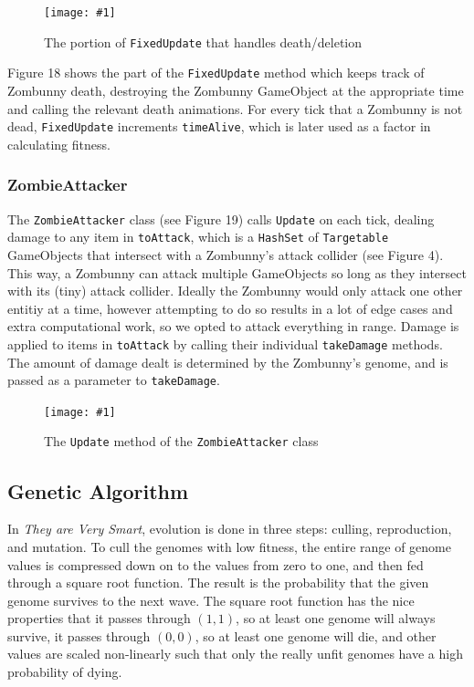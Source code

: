 \documentclass[letterpaper]{article}
\def\imfig#1#2{\begin{figure}[h] \centering \texttt{[image: \#1]} \caption{#2} \end{figure}}
\def\tavs{\textit{They are Very Smart}}
\begin{document}
\imfig{ZombieAgentUpdateDeath}{The portion of \texttt{FixedUpdate} that handles
  death/deletion}

Figure 18 shows the part of the \texttt{FixedUpdate} method which keeps track of Zombunny
death, destroying the Zombunny GameObject at the appropriate time and calling
the relevant death animations. For every tick that a Zombunny is not dead,
\texttt{FixedUpdate} increments \texttt{timeAlive}, which is later used as a factor in
calculating fitness.

\subsubsection{ZombieAttacker}

The \texttt{ZombieAttacker} class (see Figure 19) calls \texttt{Update} on each tick, dealing damage to any item
in \texttt{toAttack}, which is a \texttt{HashSet} of \texttt{Targetable} GameObjects that intersect with
a Zombunny's attack collider (see Figure 4). This way, a Zombunny can attack
multiple GameObjects so long as they intersect with its (tiny) attack collider.
Ideally the Zombunny would only attack one other entitiy at a time, however
attempting to do so results in a lot of edge cases and extra computational work,
so we opted to attack everything in range. Damage
is applied to items in \texttt{toAttack} by calling their individual
\texttt{takeDamage} methods. The amount of damage dealt is determined by the Zombunny's genome, and is passed as a parameter
to \texttt{takeDamage}.

\imfig{ZombieAttacker}{The \texttt{Update} method of the \texttt{ZombieAttacker} class}



\subsection{Genetic Algorithm}

In \tavs, evolution is done in three steps: culling, reproduction, and mutation.
To cull the genomes with low fitness, the entire range of genome values is
compressed down on to the values from zero to one, and then fed through a square
root function. The result is the probability that the given genome survives to
the next wave. The square root function has the nice properties that it passes
through \((1,1)\), so at least one genome will always survive, it passes through
\((0,0)\), so at least one genome will die, and other values are scaled
non-linearly such that only the really unfit genomes have a high probability of
dying.
\end{document}
